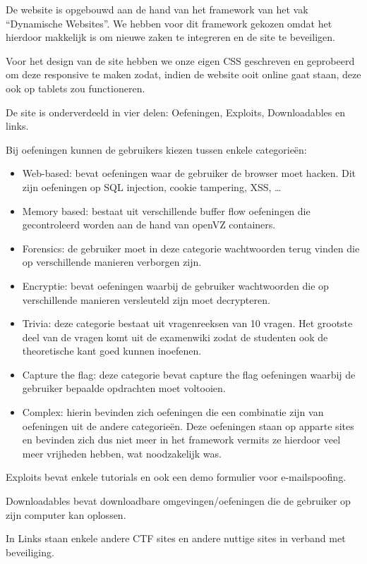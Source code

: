 De website is opgebouwd aan de hand van het framework van het vak ``Dynamische Websites''. We hebben voor dit framework gekozen omdat het hierdoor makkelijk is om nieuwe zaken te integreren en de site te beveiligen.

Voor het design van de site hebben we onze eigen CSS geschreven en geprobeerd om deze responsive te maken zodat, indien de website ooit online gaat staan, deze ook op tablets zou functioneren.

De site is onderverdeeld in vier delen: Oefeningen, Exploits, Downloadables en links.

Bij oefeningen kunnen de gebruikers kiezen tussen enkele categorieën:
\begin{itemize}
\item Web-based: bevat oefeningen waar de gebruiker de browser moet hacken. Dit zijn oefeningen op SQL injection, cookie tampering, XSS, \ldots
\item Memory based: bestaat uit verschillende buffer flow oefeningen die gecontroleerd worden aan de hand van openVZ containers.
\item Forensics: de gebruiker moet in deze categorie wachtwoorden terug vinden die op verschillende manieren verborgen zijn.
\item Encryptie: bevat oefeningen waarbij de gebruiker wachtwoorden die op verschillende manieren versleuteld zijn moet decrypteren.
\item Trivia: deze categorie bestaat uit vragenreeksen van 10 vragen. Het grootste deel van de vragen komt uit de examenwiki zodat de studenten ook de theoretische kant goed kunnen inoefenen.
\item Capture the flag: deze categorie bevat capture the flag oefeningen waarbij de gebruiker bepaalde opdrachten moet voltooien.
\item Complex: hierin bevinden zich oefeningen die een combinatie zijn van oefeningen uit de andere categorie\"en. Deze oefeningen staan op apparte sites en bevinden zich dus niet meer in het framework vermits ze hierdoor veel meer vrijheden hebben, wat noodzakelijk was.
\end{itemize}

Exploits bevat enkele tutorials en ook een demo formulier voor e-mailspoofing.

Downloadables bevat downloadbare omgevingen/oefeningen die de gebruiker op zijn computer kan oplossen.

In Links staan enkele andere CTF sites en andere nuttige sites in verband met beveiliging.

